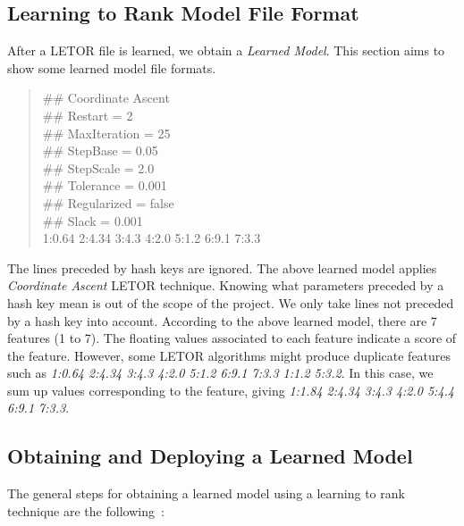 \subsection{Learning to Rank Model File Format}
After a LETOR file is learned, we obtain a \textit{Learned Model}. This section aims to show some learned model file formats.
\begin{quotation}
\noindent \#\# Coordinate Ascent \\
\#\# Restart = 2 \\
\#\# MaxIteration = 25 \\
\#\# StepBase = 0.05 \\
\#\# StepScale = 2.0 \\
\#\# Tolerance = 0.001 \\
\#\# Regularized = false \\
\#\# Slack = 0.001 \\
1:0.64 2:4.34 3:4.3 4:2.0 5:1.2 6:9.1 7:3.3
\end{quotation}
The lines preceded by hash keys are ignored. The above learned model applies \textit{Coordinate Ascent} LETOR technique. Knowing what parameters preceded by a hash key
mean is out of the scope of the project. We only take lines not preceded by a hash key into account. According to the above learned model, there are
7 features (1 to 7). The floating values associated to each feature indicate a score of the feature. However, some LETOR algorithms might produce
duplicate features such as \textit{1:0.64 2:4.34 3:4.3 4:2.0 5:1.2 6:9.1 7:3.3 1:1.2 5:3.2}. In this case, we sum up values corresponding
to the feature, giving \textit{1:1.84 2:4.34 3:4.3 4:2.0 5:4.4 6:9.1 7:3.3}.


\subsection{Obtaining and Deploying a Learned Model} \label{sec:learnedmodel}
The general steps for obtaining a learned model using a learning to rank technique are the following~\cite[P. 4]{learningmodel}:

